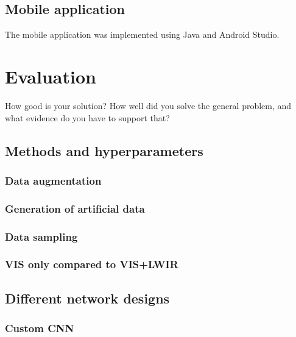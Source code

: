 \documentclass{l4proj}
\begin{document}
\section{Mobile application}

The mobile application was implemented using Java and Android Studio. 




\chapter{Evaluation} 
How good is your solution? How well did you solve the general problem, and what evidence do you have to support that?

\section{Methods and hyperparameters}

\subsection{Data augmentation}

\subsection{Generation of artificial data}

\subsection{Data sampling}

\subsection{VIS only compared to VIS+LWIR}


\section{Different network designs}

\subsection{Custom CNN}
\end{document}
